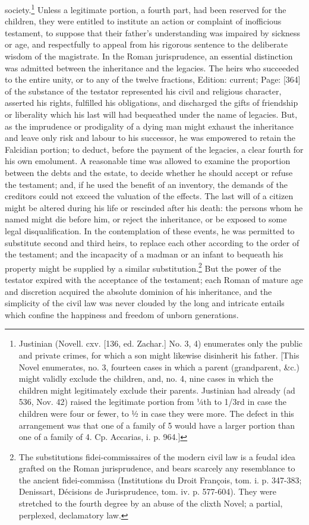 society.\footnote{Justinian (Novell. cxv. [136, ed. Zachar.] No. 3, 4) enumerates only the public and private crimes, for which a son might likewise disinherit his father. [This Novel enumerates, no. 3, fourteen cases in which a parent (grandparent, \&c.) might validly exclude the children, and, no. 4, nine cases in which the children might legitimately exclude their parents. Justinian had already (ad 536, Nov. 42) raised the legitimate portion from ¼th to \texthebrew{1/3}rd in case the children were four or fewer, to ½ in case they were more. The defect in this arrangement was that one of a family of 5 would have a larger portion than one of a family of 4. Cp. Accarias, i. p. 964.]} Unless a legitimate portion, a fourth part, had been reserved for the children, they were entitled to institute an action or complaint of inofficious testament, to suppose that their father\texthebrew{}’s understanding was impaired by sickness or age, and respectfully to appeal from his rigorous sentence to the deliberate wisdom of the magistrate. In the Roman jurisprudence, an essential distinction was admitted between the inheritance and the legacies. The heirs who succeeded to the entire unity, or to any of the twelve fractions, Edition: current; Page: [364] of the substance of the testator represented his civil and religious character, asserted his rights, fulfilled his obligations, and discharged the gifts of friendship or liberality which his last will had bequeathed under the name of legacies. But, as the imprudence or prodigality of a dying man might exhaust the inheritance and leave only risk and labour to his successor, he was empowered to retain the Falcidian portion; to deduct, before the payment of the legacies, a clear fourth for his own emolument. A reasonable time was allowed to examine the proportion between the debts and the estate, to decide whether he should accept or refuse the testament; and, if he used the benefit of an inventory, the demands of the creditors could not exceed the valuation of the effects. The last will of a citizen might be altered during his life or rescinded after his death: the persons whom he named might die before him, or reject the inheritance, or be exposed to some legal disqualification. In the contemplation of these events, he was permitted to substitute second and third heirs, to replace each other according to the order of the testament; and the incapacity of a madman or an infant to bequeath his property might be supplied by a similar substitution.\footnote{The substitutions fidei-commissaires of the modern civil law is a feudal idea grafted on the Roman jurisprudence, and bears scarcely any resemblance to the ancient fidei-commissa (Institutions du Droit François, tom. i. p. 347-383; Denissart, Décisions de Jurisprudence, tom. iv. p. 577-604). They were stretched to the fourth degree by an abuse of the clixth Novel; a partial, perplexed, declamatory law.} But the power of the testator expired with the acceptance of the testament; each Roman of mature age and discretion acquired the absolute dominion of his inheritance, and the simplicity of the civil law was never clouded by the long and intricate entails which confine the happiness and freedom of unborn generations.

